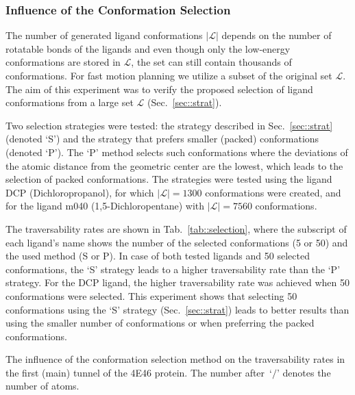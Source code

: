 \documentclass[usletter, 10pt, conference]{ieeeconf} %
\def\L{\mathcal{L}}
\begin{document}
\subsubsection{Influence of the Conformation Selection}

The number of generated ligand conformations $|\L|$ depends on the number of rotatable bonds of the ligands and even though only
the low-energy conformations are stored in $\L$, the set can still contain thousands of conformations.
For fast motion planning we utilize a subset of the original set $\L$.
The aim of this experiment was to verify the proposed selection of ligand conformations from a large set $\L$ (Sec.~\ref{sec::strat}).

Two selection strategies were tested:
the strategy described in Sec.~\ref{sec::strat} (denoted `S') and the strategy that prefers smaller (packed) conformations (denoted `P').
The `P' method selects such conformations where the deviations of the atomic distance from the geometric center are the lowest, which leads 
to the selection of packed conformations.
The strategies were tested using the ligand DCP (Dichloropropanol), for which  $|\L|=1300$ conformations were created, and for the ligand
m040 (1,5-Dichloropentane) with $|\L|=7560$ conformations.

The traversability rates are shown in Tab.~\ref{tab::selection}, where the subscript of each ligand's 
name shows the number of the selected conformations (5 or 50) and the used method (S or P).
In case of both tested ligands and 50 selected conformations, the `S' strategy leads to a higher traversability rate than the `P' strategy.
For the DCP ligand, the higher traversability rate was achieved when 50 conformations were selected.
This experiment shows that selecting 50 conformations using the `S' strategy (Sec.~\ref{sec::strat}) leads to better results
than using the smaller number of conformations or when preferring the packed conformations.

\begin{table}[bt]
\centering
\caption{\label{tab::selection}
    \small
    The influence of the conformation selection method on the traversability rates in the first (main) tunnel of the 4E46 protein.
    The number after~`$/$' denotes the number of atoms.
}
\small
\renewcommand{\tabcolsep}{4.3pt}
{\scriptsize

}
\end{table}
\end{document}
